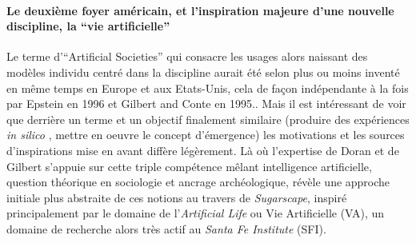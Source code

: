 \paragraph{Le deuxième foyer américain, et l'inspiration majeure d'une nouvelle discipline, la \enquote{vie artificielle}}

Le terme d'\foreignquote{english}{Artificial Societies}  qui consacre les usages alors naissant des modèles individu centré dans la discipline aurait été selon \textcite{Gilbert2000a} plus ou moins inventé en même temps en Europe et aux Etats-Unis, cela de façon indépendante à la fois par Epstein en 1996 et Gilbert and Conte en 1995.. Mais il est intéressant de voir que derrière un terme et un objectif finalement similaire (produire des expériences \textit{in silico} , mettre en oeuvre le concept d'émergence) les motivations et les sources d'inspirations mise en avant diffère légèrement. Là où l'expertise de Doran et de Gilbert s'appuie sur cette triple compétence mêlant intelligence artificielle, question théorique en sociologie et ancrage archéologique,  \autocite[17-19]{Epstein1996} révèle une approche initiale plus abstraite de ces notions au travers de \textit{Sugarscape}, inspiré principalement par le domaine de l'\textit{Artificial Life} ou Vie Artificielle (VA), un domaine de recherche alors très actif au \textit{Santa Fe Institute} (SFI).


